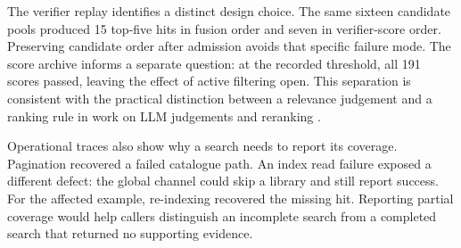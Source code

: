 The verifier replay identifies a distinct design choice. The same sixteen
candidate pools produced 15 top-five hits in fusion order and seven in
verifier-score order. Preserving candidate order after admission avoids
that specific failure mode. The score archive informs a separate question:
at the recorded threshold, all 191 scores passed, leaving the effect of
active filtering open. This separation is consistent with the practical
distinction between a relevance judgement and a ranking rule in work on
LLM judgements and reranking \citep{zheng-llmjudge,sun-urara}.

Operational traces also show why a search needs to report its coverage.
Pagination recovered a failed catalogue path. An index read failure exposed
a different defect: the global channel could skip a library and still report
success. For the affected example, re-indexing recovered the missing hit.
Reporting partial coverage would help callers distinguish an incomplete search
from a completed search that returned no supporting evidence.
